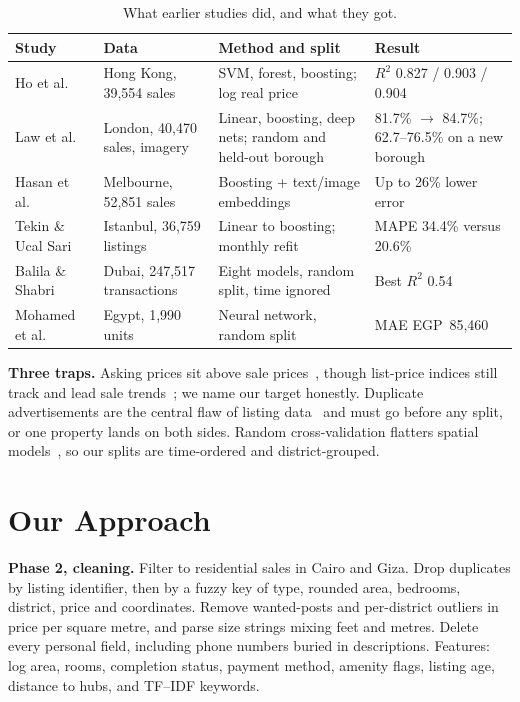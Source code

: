 \documentclass[sigconf,nonacm,10pt]{acmart}
\begin{document}
\begin{table}[t]
\caption{What earlier studies did, and what they got.}
\label{tab:lit}
\small
\begin{tabularx}{\textwidth}{@{}lXXX@{}}
\toprule
Study & Data & Method and split & Result \\
\midrule
Ho et al.~\cite{ho2021predicting} & Hong Kong, 39,554 sales & SVM, forest, boosting; log real price & $R^2$ 0.827 / 0.903 / 0.904 \\
Law et al.~\cite{law2019take} & London, 40,470 sales, imagery & Linear, boosting, deep nets; random and held-out borough & 81.7\% $\rightarrow$ 84.7\%; 62.7--76.5\% on a new borough \\
Hasan et al.~\cite{hasan2024multimodal} & Melbourne, 52,851 sales & Boosting + text/image embeddings & Up to 26\% lower error \\
Tekin \& Ucal Sari~\cite{tekin2022istanbul} & Istanbul, 36,759 listings & Linear to boosting; monthly refit & MAPE 34.4\% versus 20.6\% \\
Balila \& Shabri~\cite{balila2024dubai} & Dubai, 247,517 transactions & Eight models, random split, time ignored & Best $R^2$ 0.54 \\
Mohamed et al.~\cite{mohamed2023egypt} & Egypt, 1,990 units & Neural network, random split & MAE EGP~85,460 \\
\bottomrule
\end{tabularx}
\end{table}

\textbf{Three traps.} Asking prices sit above sale prices~\cite{kolbe2021listings}, though list-price indices still track and lead sale trends~\cite{lyons2019list}; we name our target honestly. Duplicate advertisements are the central flaw of listing data~\cite{loberto2020} and must go before any split, or one property lands on both sides. Random cross-validation flatters spatial models~\cite{deppner2024spatial,roberts2017cv}, so our splits are time-ordered and district-grouped.

\section{Our Approach}

\textbf{Phase 2, cleaning.} Filter to residential sales in Cairo and Giza. Drop duplicates by listing identifier, then by a fuzzy key of type, rounded area, bedrooms, district, price and coordinates. Remove wanted-posts and per-district outliers in price per square metre, and parse size strings mixing feet and metres. Delete every personal field, including phone numbers buried in descriptions. Features: log area, rooms, completion status, payment method, amenity flags, listing age, distance to hubs, and TF--IDF keywords.
\end{document}
